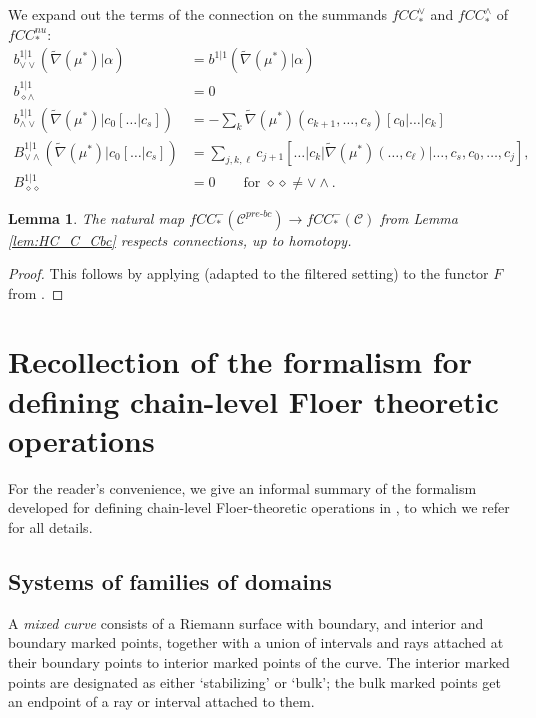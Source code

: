 \documentclass{article}
\newtheorem{lem}{Lemma}[section]
\def\cC{\mathcal{C}}
\def\prebc{{pre\text{-}bc}}
\begin{document}
We expand out the terms of the connection on the summands $fCC_*^\vee$ and $fCC_*^\wedge$ of $fCC_*^{nu}$:
\begin{align*}
    b^{1|1}_{\vee\vee}(\tilde \nabla(\mu^*)|\alpha) &= b^{1|1}(\tilde\nabla(\mu^*)|\alpha)\\
    b^{1|1}_{\diamond\wedge} &= 0\\
    b^{1|1}_{\wedge\vee}(\tilde \nabla(\mu^*)|c_0[\ldots|c_s]) &= -\sum_{k} \tilde\nabla(\mu^*)(c_{k+1},\ldots,c_s)[c_0|\ldots|c_k]\\
    B^{1|1}_{\vee\wedge}(\tilde{\nabla}(\mu^*)|c_0[\ldots|c_s]) &= \sum_{j,k,\ell} c_{j+1}[\ldots|c_k|\tilde\nabla(\mu^*)(\ldots,c_\ell)|\ldots,c_s,c_0,\ldots,c_j ],\\
    B^{1|1}_{\diamond \diamond} &= 0 \qquad\text{for $\diamond\diamond \neq \vee\wedge$.}
\end{align*}

\begin{lem}\label{lem:GGM_C_Cbc}
The natural map $fCC_*^-(\cC^{\prebc}) \to fCC_*^-(\cC)$ from Lemma \ref{lem:HC_C_Cbc} respects connections, up to homotopy.
\end{lem}
\begin{proof}
    This follows by applying \cite[Theorem 3.32]{Sheridan_formulae} (adapted to the filtered setting) to the functor $F$ from \cite[Lemma 2.14]{relfukii}.
\end{proof}

\section{Recollection of the formalism for defining chain-level Floer theoretic operations}

For the reader's convenience, we give an informal summary of the formalism developed for defining chain-level Floer-theoretic operations in \cite{relfukii}, to which we refer for all details.

\subsection{Systems of families of domains}

A \emph{mixed curve} consists of a Riemann surface with boundary, and interior and boundary marked points, together with a union of intervals and rays attached at their boundary points to interior marked points of the curve. 
The interior marked points are designated as either `stabilizing' or `bulk'; the bulk marked points get an endpoint of a ray or interval attached to them. 
\end{document}
